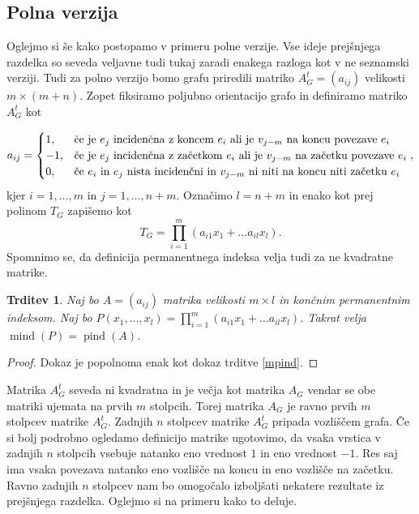 \documentclass[12pt,a4paper,twoside]{article}
\theoremstyle{definition} %
\theoremstyle{plain} %
\newtheorem{trditev}[definicija]{Trditev}
\numberwithin{equation}{section}  %
\DeclareMathOperator{\mind}{mind}
\DeclareMathOperator{\pind}{pind}
\begin{document}
\subsection{Polna verzija}
Oglejmo si še kako postopamo v primeru polne verzije. Vse ideje prejšnjega razdelka so seveda veljavne tudi tukaj zaradi enakega razloga kot v ne seznamski verziji. Tudi za polno verzijo bomo grafu priredili matriko $A_G^t = (a_{ij})$ velikosti $m \times (m+n)$. Zopet fiksiramo poljubno orientacijo grafo in definiramo matriko $A_G^t$ kot

\begin{equation*}
a_{ij} = 
\begin{cases}

1, & \text{če je $e_j$ incidenčna z koncem $e_i$ ali je $v_{j-m}$ na koncu povezave $e_i$}\\ 
	-1, & \text{če je $ e_j$ incidenčna z začetkom  $e_i$ ali je $v_{j-m}$ na začetku povezave $e_i$} \\

0, & \text{če $e_i$ in $e_j$ nista incidenčni in $v_{j-m}$ ni niti na koncu niti začetku $e_i$}
\end{cases},
\end{equation*}
kjer $i=1,\ldots, m$ in $j=1, \ldots, n+m$. Označimo $l=n+m$ in enako kot prej  polinom $T_G$ zapišemo kot 
$$T_G = \prod_{i=1}^m (a_{i1}x_1 + \ldots a_{il}x_l).$$
Spomnimo se, da definicija permanentnega indeksa velja tudi za ne kvadratne matrike.
\begin{trditev}
Naj bo $A = (a_{ij})$  matrika velikosti $m \times l$ in končnim permanentnim indeksom. Naj bo $P(x_1, \ldots, x_l) = \prod_{i=1}^m (a_{i1}x_1 + \ldots a_{il}x_l)$. Takrat velja $\mind(P) = \pind(A)$.
\end{trditev}
\begin{proof}
Dokaz je popolnoma enak kot dokaz trditve \ref{mpind}.
\end{proof}
Matrika $A_G^t$ seveda ni kvadratna in je večja kot matrika $A_G$ vendar se obe matriki ujemata na prvih $m$ stolpcih. Torej matrika $A_G$ je ravno prvih $m$ stolpcev matrike $A_G^t$. Zadnjih $n$ stolpcev matrike $A_G^t$ pripada vozliščem grafa. Če si bolj podrobno ogledamo definicijo matrike ugotovimo, da vsaka vrstica v zadnjih $n$ stolpcih vsebuje natanko eno vrednost $1$ in eno vrednost $-1$. Res saj ima vsaka povezava natanko eno vozlišče na koncu in eno vozlišče na začetku. Ravno zadnjih $n$ stolpcev nam bo omogočalo izboljšati nekatere rezultate iz prejšnjega razdelka. Oglejmo si na primeru kako to deluje.
\end{document}
